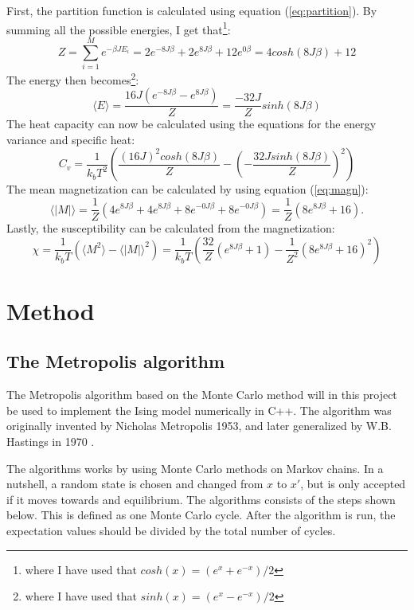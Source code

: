 \documentclass[10pt,a4paper,titlepage]{article}
\begin{document}
First, the partition function is calculated using equation (\ref{eq:partition}). By summing all the possible energies, I get that\footnote{where I have used that $cosh(x) = ( e^x + e^{-x} )/2$}:
\begin{equation}
Z = \sum_{i=1}^{M}e^{-\beta JE_{i}} = 2e^{-8J\beta}+2e^{8J\beta}+12e^{0\beta} = 4 cosh(8J\beta)+12
\end{equation}
The energy then becomes\footnote{where I have used that $sinh(x) = ( e^x - e^{-x} )/2$}:
\begin{equation}
\langle E\rangle=\frac{16J(e^{-8J\beta}-e^{8J\beta})}{Z}=\frac{-32J}{Z}sinh(8J\beta)
\end{equation}
The heat capacity can now be calculated using the equations for the energy variance and specific heat:
\begin{equation}
C_v = \frac{1}{k_{b}T^2}\left(\frac{(16J)^{2}cosh(8J\beta)}{Z}-\left(-\frac{32Jsinh(8J\beta)}{Z}\right)^{2}\right)
\end{equation}
The mean magnetization can be calculated by using equation (\ref{eq:magn}):
\begin{equation}
\langle|M|\rangle = \frac{1}{Z}\left(4e^{8J\beta}+4e^{8J\beta}+8e^{-0J\beta}+8e^{-0J\beta}\right)=\frac{1}{Z}\left(8e^{8J\beta}+16\right).
\end{equation}
Lastly, the susceptibility can be calculated from the magnetization:
\begin{equation}
\chi = \frac{1}{k_{b}T}\left(\langle M^2\rangle-\langle|M|\rangle^2\right)=\frac{1}{k_{b}T}\left(\frac{32}{Z}\left(e^{8J\beta}+1\right)-\frac{1}{Z^{2}}\left(8e^{8J\beta}+16\right)^{2}\right)
\end{equation}


\section{Method}
\subsection{The Metropolis algorithm}
The Metropolis algorithm based on the Monte Carlo method will in this project be used to implement the Ising model numerically in C++. The algorithm was originally invented by Nicholas Metropolis 1953, and later generalized by W.B. Hastings in 1970 \cite{metro}.

The algorithms works by using Monte Carlo methods on Markov chains. In a nutshell, a random state is chosen and changed from $x$ to $x'$, but is only accepted if it moves towards and equilibrium. The algorithms consists of the steps shown below. This is defined as one Monte Carlo cycle. After the algorithm is run, the expectation values should be divided by the total number of cycles. 
\end{document}
